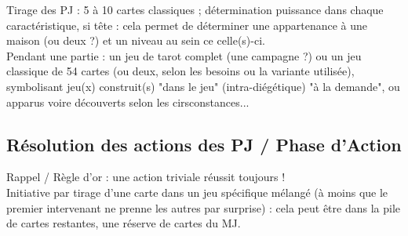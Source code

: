 \documentclass[11pt,twoside,a4paper]{article}
\begin{document}
Tirage des PJ : 5 {\`a} 10 cartes classiques ; d{\'e}termination puissance dans chaque caract{\'e}ristique, si t{\^e}te : cela permet de d{\'e}terminer une appartenance {\`a} une maison (ou deux ?) et un niveau au sein ce celle(s)-ci. ~\\

Pendant une partie : un jeu de tarot complet (une campagne ?) ou un jeu classique de 54 cartes (ou deux, selon les besoins ou la variante utilis{\'e}e), symbolisant jeu(x) construit(s) "dans le jeu" (intra-di{\'e}g{\'e}tique) "{\`a} la demande", ou apparus voire d{\'e}couverts selon les cirsconstances... ~\\

\subsection{R{\'e}solution des actions des PJ / Phase d'Action}

Rappel / R{\`e}gle d'or : une action triviale r{\'e}ussit toujours !~\\

Initiative par tirage d'une carte dans un jeu sp{\'e}cifique m{\'e}lang{\'e} ({\`a} moins que le premier intervenant ne prenne les autres par surprise) : cela peut {\^e}tre dans la pile de cartes restantes, une r{\'e}serve de cartes du MJ.~\\
\end{document}
